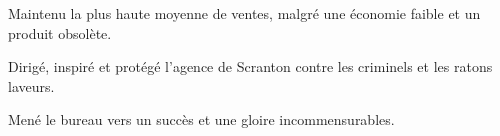 \begin{achievements}
	\item Maintenu la plus haute moyenne de ventes, malgré une économie faible et un produit obsolète.
	\item Dirigé, inspiré et protégé l’agence de Scranton contre les criminels et les ratons laveurs.
	\item Mené le bureau vers un succès et une gloire incommensurables.
\end{achievements}
